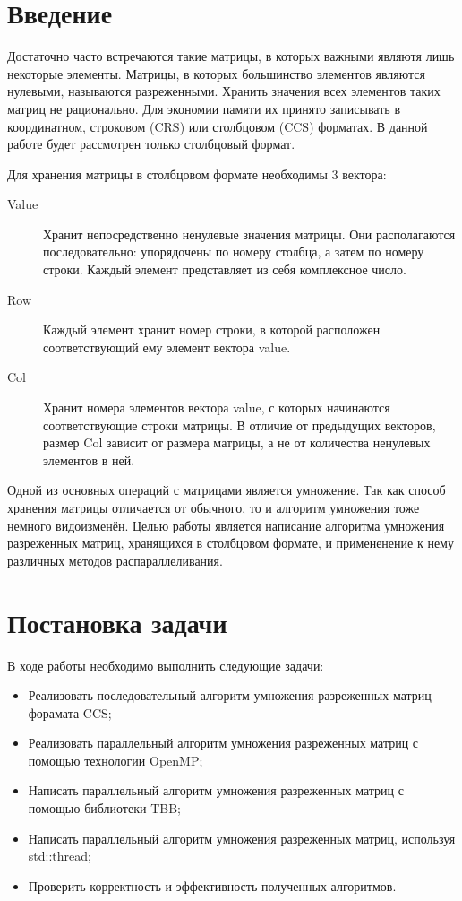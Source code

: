 \documentclass{report}
\begin{document}
\setcounter{page}{2}

\tableofcontents
\newpage

\section*{Введение}
Достаточно часто встречаются такие матрицы, в которых важными являютя лишь некоторые элементы. Матрицы, в которых большинство элементов являются нулевыми, называются разреженными. Хранить значения всех элементов таких матриц не рационально. Для экономии памяти их принято записывать в координатном, строковом (CRS) или столбцовом (CCS) форматах. В данной работе будет рассмотрен только столбцовый формат.
\par Для хранения матрицы в столбцовом формате необходимы 3 вектора:
\begin{description}
	\item [Value] Хранит непосредственно ненулевые значения матрицы. Они располагаются последовательно: упорядочены по номеру столбца, а затем по номеру строки. Каждый элемент представляет из себя комплексное число.
	\item [Row] Каждый элемент хранит номер строки, в которой расположен соответствующий ему элемент вектора value.
	\item [Col] Хранит номера элементов вектора value, с которых начинаются соответствующие строки матрицы. В отличие от предыдущих векторов, размер Col зависит от размера матрицы, а не от количества ненулевых элементов в ней.
\end{description}
\par Одной из основных операций с матрицами является умножение. Так как способ хранения матрицы отличается от обычного, то и алгоритм умножения тоже немного видоизменён. Целью работы является написание алгоритма умножения разреженных матриц, хранящихся в столбцовом формате, и примененение к нему различных методов распараллеливания.
\newpage

\section*{Постановка задачи}
В ходе работы необходимо выполнить следующие задачи:
\begin {itemize}
	\item Реализовать последовательный алгоритм умножения разреженных матриц форамата CCS;
	\item Реализовать параллельный алгоритм умножения разреженных матриц с помощью технологии OpenMP;
	\item Написать параллельный алгоритм умножения разреженных матриц с помощью библиотеки TBB;
	\item Написать параллельный алгоритм умножения разреженных матриц, используя std::thread;
	\item Проверить корректность и эффективность полученных алгоритмов.
\end {itemize}
\newpage
\end{document}
